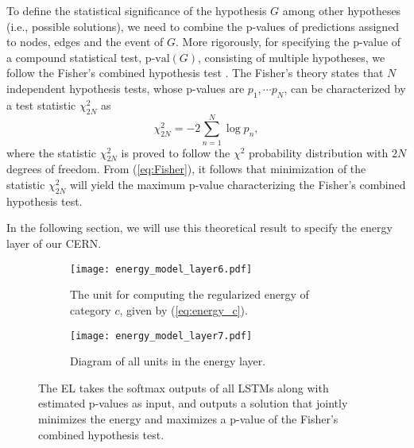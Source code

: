 \documentclass[10pt,twocolumn,letterpaper]{article}
\begin{document}
To define the statistical significance of the hypothesis $G$  among other hypotheses (i.e., possible solutions), we need to combine the p-values of predictions assigned to nodes, edges and the event of $G$. More rigorously, for specifying the p-value of a compound statistical test, $\text{p-val}(G)$, consisting of multiple hypotheses, we follow the Fisher's combined hypothesis test \cite{Fisher1950}. The Fisher's theory states that $N$ independent hypothesis tests, whose p-values are $p_1, \cdots p_N$, can be characterized by a test statistic $\chi^2_{2N}$ as
\begin{equation}
\chi^2_{2N} = -2\sum_{n=1}^N\log p_n,
\label{eq:Fisher}
\end{equation}
where the statistic $\chi^2_{2N}$ is proved to follow the $\chi^2$ probability distribution with $2N$ degrees of freedom. From (\ref{eq:Fisher}), it follows that minimization of the statistic $\chi^2_{2N}$ will yield the maximum p-value characterizing the  Fisher's combined hypothesis test. 

In the following section, we will use this theoretical result to specify the energy layer of our CERN. 



  \begin{figure}[t!]
   \centering
   \begin{subfigure}{1.0\linewidth}
      \centering
      \texttt{[image: energy\_model\_layer6.pdf]}
	\caption{The unit for computing the regularized energy of category $c$, given by (\ref{eq:energy_c}).}
	\label{fig:energy_network_a}
	\end{subfigure}

   \begin{subfigure}{1.0\linewidth}
      \centering
      \texttt{[image: energy\_model\_layer7.pdf]}
	\caption{Diagram of all units in the energy layer.}
	\label{fig:energy_network_b}
   \end{subfigure}
      \caption{The EL takes the softmax outputs of all LSTMs along with estimated p-values as input, and outputs a solution that jointly minimizes the energy and maximizes a p-value of the Fisher's combined hypothesis test.}
      \label{fig:energy_network}
   \end{figure}
\end{document}

